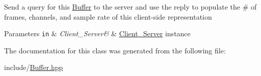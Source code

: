 Send a query for this \hyperlink{classColliderPlusPlus_1_1Buffer}{Buffer} to the server and use the reply to populate the \# of frames, channels, and sample rate of this client-\/side representation 
\begin{DoxyParams}[1]{Parameters}
\mbox{\tt in}  & {\em Client\-\_\-\-Server\&} & \hyperlink{classColliderPlusPlus_1_1Client__Server}{Client\-\_\-\-Server} instance \\
\hline
\end{DoxyParams}


The documentation for this class was generated from the following file\-:\begin{DoxyCompactItemize}
\item 
include/\hyperlink{Buffer_8hpp}{Buffer.\-hpp}\end{DoxyCompactItemize}
